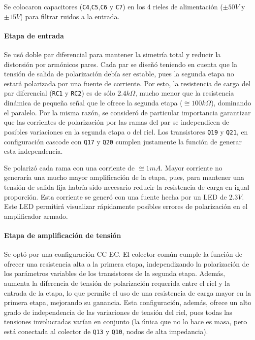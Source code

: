 \documentclass[a4paper,12pt,twoside]{article}
\begin{document}
Se colocaron capacitores (\texttt{C4},\texttt{C5},\texttt{C6} y \texttt{C7}) en los 4 rieles de alimentación ($\pm 50V$ y $\pm 15V$) para filtrar ruidos a la entrada.

\paragraph{Etapa de entrada}

Se usó doble par diferencial para mantener la simetría total y reducir la distorsión por armónicos pares. Cada par se diseñó teniendo en cuenta que la tensión de salida de polarización debía ser estable, pues la segunda etapa no estará polarizada por una fuente de corriente. Por esto, la resistencia de carga del par diferencial (\texttt{RC1} y \texttt{RC2}) es de sólo $2.4k\Omega$, mucho menor que la resistencia dinámica de pequeña señal que le ofrece la segunda etapa ($\cong 100k\Omega$), dominando el paralelo.
Por la misma razón, se consideró de particular importancia garantizar que las corrientes de polarización por las ramas del par se independicen de posibles variaciones en la segunda etapa o del riel. Los transistores \texttt{Q19} y \texttt{Q21}, en configuración cascode con \texttt{Q17} y \texttt{Q20} cumplen justamente la función de generar esta independencia.

Se polarizó cada rama con una corriente de $\cong 1mA$. Mayor corriente no generaría una mucho mayor amplificación de la etapa, pues, para mantener una tensión de salida fija habría sido necesario reducir la resistencia de carga en igual proporción. Esta corriente se generó con una fuente hecha por un LED de $2.3V$. Este LED permitirá visualizar rápidamente posibles errores de polarización en el amplificador armado.


\paragraph{Etapa de amplificación de tensión}

Se optó por una configuración CC-EC. El colector común cumple la función de ofrecer una resistencia alta a la primera etapa, independizando la polarización de los parámetros variables de los transistores de la segunda etapa. Además, aumenta la diferencia de tensión de polarización requerida entre el riel y la entrada de la etapa, lo que permite el uso de una resistencia de carga mayor en la primera etapa, mejorando su ganancia. Esta configuración, además, ofrece un alto grado de independencia de las variaciones de tensión del riel, pues todas las tensiones involucradas varían en conjunto (la única que no lo hace es masa, pero está conectada al colector de \texttt{Q13} y \texttt{Q10}, nodos de alta impedancia). 
\end{document}
